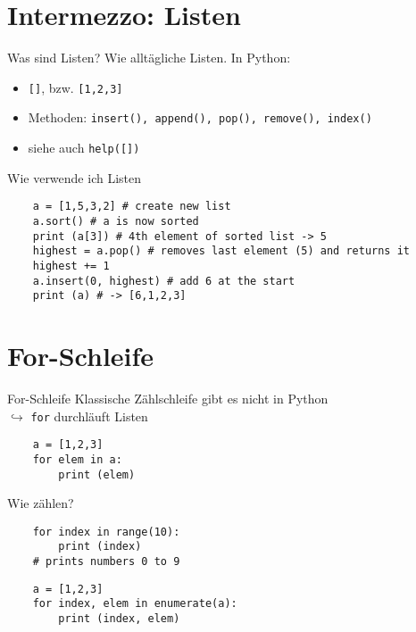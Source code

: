 \section{Intermezzo: Listen}

\begin{frame}{Was sind Listen?}
    Wie alltägliche Listen. In Python:
    \begin{itemize}
        \item \texttt{[]}, bzw. \texttt{[1,2,3]}
        \item Methoden: \texttt{insert(), append(), pop(), remove(), index()}
        \item siehe auch \texttt{help([])}
    \end{itemize}
\end{frame}

\begin{frame}[fragile]{Wie verwende ich Listen}
    \begin{lstlisting}
    a = [1,5,3,2] # create new list
    a.sort() # a is now sorted
    print (a[3]) # 4th element of sorted list -> 5
    highest = a.pop() # removes last element (5) and returns it
    highest += 1
    a.insert(0, highest) # add 6 at the start
    print (a) # -> [6,1,2,3]
    \end{lstlisting}
\end{frame}

\section{For-Schleife}

\begin{frame}[fragile]{For-Schleife}
    Klassische Zählschleife gibt es nicht in Python\\
    $\hookrightarrow$ \texttt{for} durchläuft Listen
    \begin{lstlisting}
    a = [1,2,3]
    for elem in a:
        print (elem)
    \end{lstlisting}
\end{frame}

\begin{frame}[fragile]{Wie zählen?}
    \begin{lstlisting}
    for index in range(10):
        print (index)
    # prints numbers 0 to 9
    \end{lstlisting}
    \begin{lstlisting}
    a = [1,2,3]
    for index, elem in enumerate(a):
        print (index, elem)
    \end{lstlisting}
\end{frame}


